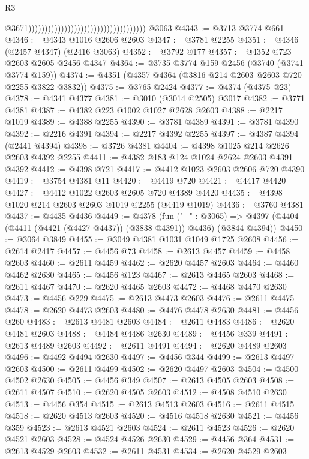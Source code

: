 \begin{lexlean}{R3}
\begin{coremodule}
                                                                            @3671))))))))))))))))))))))))))))))))))))
    @3063
@4343 := @3713 @3774 @661
@4346 := @4343 @1016 @2606 @2603
@4347 := @3781 @2255
@4351 := @4346 (@2457 @4347) (@2416 @3063)
@4352 := @3792 @177
@4357 := @4352 @723 @2603 @2605 @2456 @4347
@4364 := @3735 @3774 @159 @2456 (@3740 (@3741 @3774 @159))
@4374 := @4351 (@4357 @4364 (@3816 @214 @2603 @2603 @720 @2255 @3822 @3832))
@4375 := @3765 @2424
@4377 := @4374 (@4375 @23)
@4378 := @4341 @4377
@4381 := @3010 (@3014 @2505) @3017
@4382 := @3771 @4381
@4387 := @4382 @223 @1002 @1027 @2628 @2603
@4388 := @2217 @1019
@4389 := @4388 @2255
@4390 := @3781 @4389
@4391 := @3781 @4390
@4392 := @2216 @4391
@4394 := @2217 @4392 @2255
@4397 := @4387 @4394 (@2441 @4394)
@4398 := @3726 @4381
@4404 := @4398 @1025 @214 @2626 @2603 @4392 @2255
@4411 := @4382 @183 @124 @1024 @2624 @2603 @4391 @4392
@4412 := @4398 @721
@4417 := @4412 @1023 @2603 @2606 @720 @4390
@4419 := @3754 @4381 @11
@4420 := @4419 @720
@4421 := @4417 @4420
@4427 := @4412 @1022 @2603 @2605 @720 @4389 @4420
@4435 := @4398 @1020 @214 @2603 @2603 @1019 @2255 (@4419 @1019)
@4436 := @3760 @4381
@4437 := @4435 @4436
@4449 := @4378
    (fun ("_" : @3065) =>
    @4397 (@4404 (@4411 (@4421 (@4427 @4437)) (@3838 @4391)) @4436) (@3844 @4394))
@4450 := @3064 @3849
@4455 := @3049 @4381 @1031 @1049 @1725 @2608
@4456 := @2614 @2417
@4457 := @4456 @73
@4458 := @2613 @4457
@4459 := @4458 @2603
@4460 := @2611 @4459
@4462 := @2620 @4457 @2603
@4464 := @4460 @4462 @2630
@4465 := @4456 @123
@4467 := @2613 @4465 @2603
@4468 := @2611 @4467
@4470 := @2620 @4465 @2603
@4472 := @4468 @4470 @2630
@4473 := @4456 @229
@4475 := @2613 @4473 @2603
@4476 := @2611 @4475
@4478 := @2620 @4473 @2603
@4480 := @4476 @4478 @2630
@4481 := @4456 @260
@4483 := @2613 @4481 @2603
@4484 := @2611 @4483
@4486 := @2620 @4481 @2603
@4488 := @4484 @4486 @2630
@4489 := @4456 @339
@4491 := @2613 @4489 @2603
@4492 := @2611 @4491
@4494 := @2620 @4489 @2603
@4496 := @4492 @4494 @2630
@4497 := @4456 @344
@4499 := @2613 @4497 @2603
@4500 := @2611 @4499
@4502 := @2620 @4497 @2603
@4504 := @4500 @4502 @2630
@4505 := @4456 @349
@4507 := @2613 @4505 @2603
@4508 := @2611 @4507
@4510 := @2620 @4505 @2603
@4512 := @4508 @4510 @2630
@4513 := @4456 @354
@4515 := @2613 @4513 @2603
@4516 := @2611 @4515
@4518 := @2620 @4513 @2603
@4520 := @4516 @4518 @2630
@4521 := @4456 @359
@4523 := @2613 @4521 @2603
@4524 := @2611 @4523
@4526 := @2620 @4521 @2603
@4528 := @4524 @4526 @2630
@4529 := @4456 @364
@4531 := @2613 @4529 @2603
@4532 := @2611 @4531
@4534 := @2620 @4529 @2603

\end{coremodule}
\end{lexlean}
